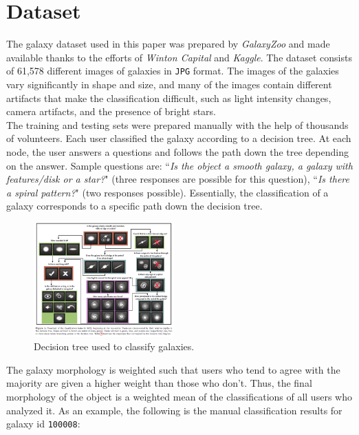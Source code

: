 \documentclass{vldb}
\begin{document}
\newpage
\section{Dataset}
The galaxy dataset used in this paper was prepared by \emph{GalaxyZoo} and made available thanks to the efforts of \emph{Winton Capital} and \emph{Kaggle}. The dataset consists of 61,578 different images of galaxies in \texttt{JPG} format. The images of the galaxies vary significantly in shape and size, and many of the images contain different artifacts that make the classification difficult, such as light intensity changes, camera artifacts, and the presence of bright stars. \\

The training and testing sets were prepared manually with the help of thousands of volunteers. Each user classified the galaxy according to a decision tree. At each node, the user answers a questions and follows the path down the tree depending on the answer. Sample questions are: ``\emph{Is the object a smooth galaxy, a galaxy with features/disk or a star?}" (three responses are possible for this question), ``\emph{Is there a spiral pattern?}" (two responses possible). Essentially, the classification of a galaxy corresponds to a specific path down the decision tree.

\begin{figure}[!ht]
    \centering
    \includegraphics[width=0.48\textwidth, trim=12 60 0 0, clip]{decision_tree.png}
    \caption{Decision tree used to classify galaxies.}
\end{figure}
\FloatBarrier

The galaxy morphology is weighted such that users who tend to agree with the majority are given a higher weight than those who don’t. Thus, the final morphology of the object is a weighted mean of the classifications of all users who analyzed it. As an example, the following is the manual classification results for galaxy id \texttt{100008}: \\
\end{document}
